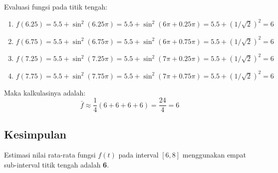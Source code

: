 Evaluasi fungsi pada titik tengah:
\begin{enumerate}
    \item $f(6.25) = 5.5 + \sin^2(6.25\pi) = 5.5 + \sin^2(6\pi + 0.25\pi) = 5.5 + (1/\sqrt{2})^2 = 6$
    \item $f(6.75) = 5.5 + \sin^2(6.75\pi) = 5.5 + \sin^2(6\pi + 0.75\pi) = 5.5 + (1/\sqrt{2})^2 = 6$
    \item $f(7.25) = 5.5 + \sin^2(7.25\pi) = 5.5 + \sin^2(7\pi + 0.25\pi) = 5.5 + (1/\sqrt{2})^2 = 6$
    \item $f(7.75) = 5.5 + \sin^2(7.75\pi) = 5.5 + \sin^2(7\pi + 0.75\pi) = 5.5 + (1/\sqrt{2})^2 = 6$
\end{enumerate}

Maka kalkulasinya adalah:
\[ \bar{f} \approx \frac{1}{4} (6 + 6 + 6 + 6) = \frac{24}{4} = 6 \]

\subsection*{Kesimpulan}
Estimasi nilai rata-rata fungsi $f(t)$ pada interval $[6, 8]$ menggunakan empat sub-interval titik tengah adalah \textbf{6}.

